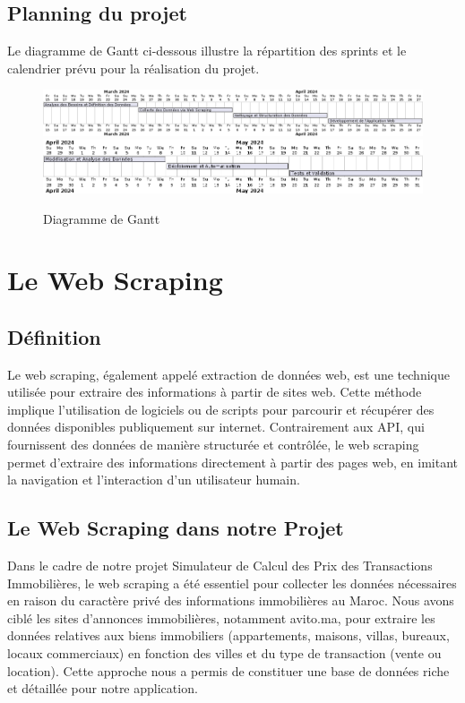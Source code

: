 \documentclass[a4paper,12pt]{report}
\numberwithin{equation}{section}
\begin{document}
\section{Planning du projet}
\vspace{0.5cm}
{\large
\par Le diagramme de Gantt ci-dessous illustre la répartition des sprints et le calendrier prévu pour la réalisation du projet.
}
\vspace{0.5cm}
\begin{figure}[h]
    \centering
        \includegraphics[width=\textwidth]{gantt1.png}
        \includegraphics[width=\textwidth]{gantt2.png}
    \caption{Diagramme de Gantt}
\end{figure}

\newpage
\chapter{Le Web Scraping}
\section{Définition}
\vspace{0.5cm}
\large{
\par Le web scraping, également appelé extraction de données web, est une technique utilisée pour extraire des informations à partir de sites web. Cette méthode implique l'utilisation de logiciels ou de scripts pour parcourir et récupérer des données disponibles publiquement sur internet. Contrairement aux API, qui fournissent des données de manière structurée et contrôlée, le web scraping permet d'extraire des informations directement à partir des pages web, en imitant la navigation et l'interaction d'un utilisateur humain.\par
}
\section{Le Web Scraping dans notre Projet}
\vspace{0.5cm}
\large{
\par Dans le cadre de notre projet Simulateur de Calcul des Prix des Transactions Immobilières, le web scraping a été essentiel pour collecter les données nécessaires en raison du caractère privé des informations immobilières au Maroc. Nous avons ciblé les sites d'annonces immobilières, notamment avito.ma, pour extraire les données relatives aux biens immobiliers (appartements, maisons, villas, bureaux, locaux commerciaux) en fonction des villes et du type de transaction (vente ou location). Cette approche nous a permis de constituer une base de données riche et détaillée pour notre application.\par
}
\end{document}
